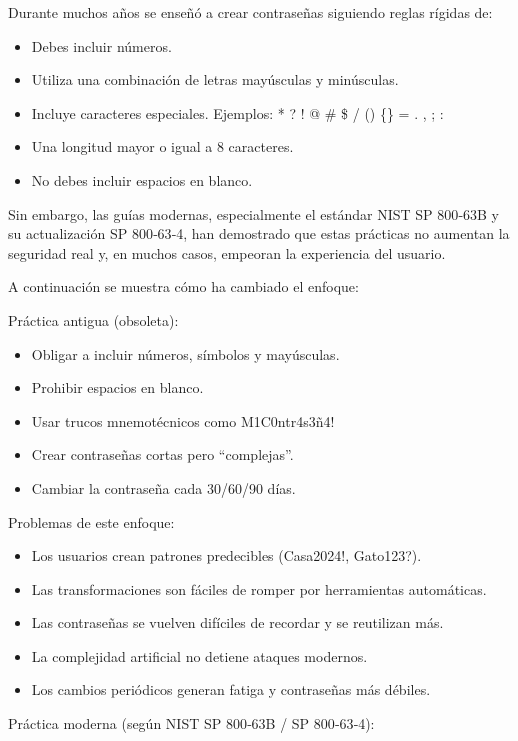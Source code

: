 \documentclass[
  spanish,
  a4paper,
  openany]{book}
\begin{document}
Durante muchos años se enseñó a crear contraseñas siguiendo reglas rígidas de:

\begin{itemize}
\item
  Debes incluir números.
\item
  Utiliza una combinación de letras mayúsculas y minúsculas.
\item
  Incluye caracteres especiales. Ejemplos: * ? ! @ \# \$ / () \{\} = . , ; :
\item
  Una longitud mayor o igual a 8 caracteres.
\item
  No debes incluir espacios en blanco.
\end{itemize}

Sin embargo, las guías modernas, especialmente el estándar NIST SP 800‑63B y su actualización SP 800‑63‑4, han demostrado que estas prácticas no aumentan la seguridad real y, en muchos casos, empeoran la experiencia del usuario.

A continuación se muestra cómo ha cambiado el enfoque:

Práctica antigua (obsoleta):

\begin{itemize}
\item
  Obligar a incluir números, símbolos y mayúsculas.
\item
  Prohibir espacios en blanco.
\item
  Usar trucos mnemotécnicos como M1C0ntr4s3ñ4!
\item
  Crear contraseñas cortas pero ``complejas''.
\item
  Cambiar la contraseña cada 30/60/90 días.
\end{itemize}

Problemas de este enfoque:

\begin{itemize}
\item
  Los usuarios crean patrones predecibles (Casa2024!, Gato123?).
\item
  Las transformaciones son fáciles de romper por herramientas automáticas.
\item
  Las contraseñas se vuelven difíciles de recordar y se reutilizan más.
\item
  La complejidad artificial no detiene ataques modernos.
\item
  Los cambios periódicos generan fatiga y contraseñas más débiles.
\end{itemize}

Práctica moderna (según NIST SP 800‑63B / SP 800‑63‑4):
\end{document}
